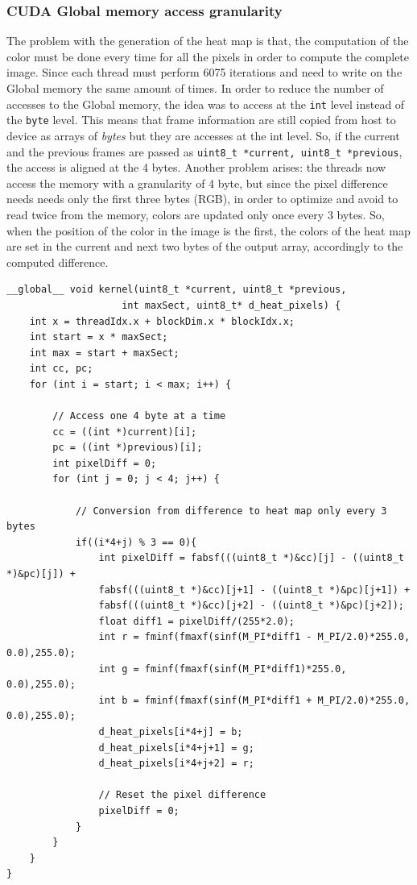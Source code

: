 \documentclass[paper=a4, fontsize=10pt]{scrartcl}	%
\begin{document}
	\subsubsection{CUDA Global memory access granularity}
	The problem with the generation of the heat map is that, the computation of the color must be done every time for all the pixels in order to compute the complete image.\newline\newline
	Since each thread must perform 6075 iterations and need to write on the Global memory the same amount of times.
	In order to reduce the number of accesses to the Global memory, the idea was to access at the \texttt{int} level instead of the \texttt{byte} level. This means that frame information are still copied from host to device as arrays of \textit{bytes} but they are accesses at the int level. So, if the current and the previous frames are passed as \texttt{uint8\_t *current, uint8\_t *previous}, the access is aligned at the 4 bytes. 
	Another problem arises: the threads now access the memory with a granularity of 4 byte, but since the pixel difference needs needs only the first three bytes (RGB), in order to optimize and avoid to read twice from the memory, colors are updated only once every 3 bytes. So, when the position of the color in the image is the first, the colors of the heat map are set in the current and next two bytes of the output array, accordingly to the computed difference.
	\begin{lstlisting}[style=CStyle]
__global__ void kernel(uint8_t *current, uint8_t *previous,
					int maxSect, uint8_t* d_heat_pixels) {
	int x = threadIdx.x + blockDim.x * blockIdx.x;
	int start = x * maxSect;
	int max = start + maxSect;
	int cc, pc;
	for (int i = start; i < max; i++) {
		
		// Access one 4 byte at a time
		cc = ((int *)current)[i];
		pc = ((int *)previous)[i];
		int pixelDiff = 0;
		for (int j = 0; j < 4; j++) {
			
			// Conversion from difference to heat map only every 3 bytes
			if((i*4+j) % 3 == 0){
				int pixelDiff = fabsf(((uint8_t *)&cc)[j] - ((uint8_t *)&pc)[j]) +
				fabsf(((uint8_t *)&cc)[j+1] - ((uint8_t *)&pc)[j+1]) +
				fabsf(((uint8_t *)&cc)[j+2] - ((uint8_t *)&pc)[j+2]);
				float diff1 = pixelDiff/(255*2.0);
				int r = fminf(fmaxf(sinf(M_PI*diff1 - M_PI/2.0)*255.0, 0.0),255.0);
				int g = fminf(fmaxf(sinf(M_PI*diff1)*255.0, 0.0),255.0);
				int b = fminf(fmaxf(sinf(M_PI*diff1 + M_PI/2.0)*255.0, 0.0),255.0);
				d_heat_pixels[i*4+j] = b;
				d_heat_pixels[i*4+j+1] = g;
				d_heat_pixels[i*4+j+2] = r;
				
				// Reset the pixel difference
				pixelDiff = 0;
			}
		}
	}
}\end{lstlisting}
\end{document}
